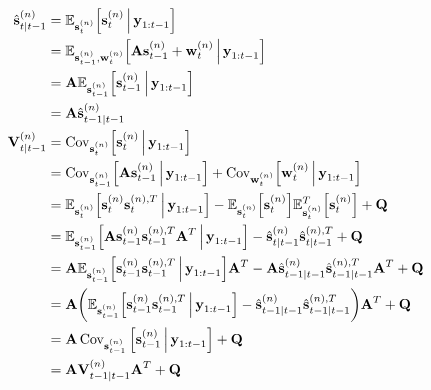 		\begin{align*}
			\hat{\vec{s}}_{t \subgiven t - 1}^{(n)}
				&= \E_{\vec{s}_t^{(n)}}\Big[\vec{s}_t^{(n)} \Biggiven \vec{y}_{1:t - 1}\Big] \\
				&= \E_{\vec{s}_{t - 1}^{(n)}, \vec{w}_t^{(n)}}\Big[\mat{A} \vec{s}_{t - 1}^{(n)} + \vec{w}_t^{(n)} \Biggiven \vec{y}_{1:t - 1}\Big] \\
				&= \mat{A} \E_{\vec{s}_{t - 1}^{(n)}}\Big[\vec{s}_{t - 1}^{(n)} \Biggiven \vec{y}_{1:t - 1}\Big] \\
				&= \mat{A} \hat{\vec{s}}_{t - 1 \subgiven t - 1}^{(n)} \\
			\mat{V}_{t \subgiven t - 1}^{(n)}
				&= \Cov_{\vec{s}_t^{(n)}}\!\Big[\vec{s}_t^{(n)} \Biggiven \vec{y}_{1:t - 1}\Big] \\
				&= \Cov_{\vec{s}_{t - 1}^{(n)}}\!\Big[\mat{A} \vec{s}_{t - 1}^{(n)} \Biggiven \vec{y}_{1:t - 1}\Big] + \Cov_{\vec{w}_t^{(n)}}\!\Big[\vec{w}_t^{(n)} \Biggiven \vec{y}_{1:t - 1}\Big] \\
				&= \E_{\vec{s}_t^{(n)}}\Big[ \vec{s}_t^{(n)} \vec{s}_t^{(n), T} \Biggiven \vec{y}_{1:t - 1} \Big] - \E_{\vec{s}_t^{(n)}}\Big[\vec{s}_t^{(n)}\Big] \E_{\vec{s}_t^{(n)}}^T\Big[\vec{s}_t^{(n)}\Big] + \mat{Q} \\
				&= \E_{\vec{s}_{t - 1}^{(n)}}\Big[ \mat{A} \vec{s}_{t - 1}^{(n)} \vec{s}_{t - 1}^{(n), T} \mat{A}^T \Biggiven \vec{y}_{1:t - 1} \Big] - \hat{\vec{s}}_{t \subgiven t - 1}^{(n)} \hat{\vec{s}}_{t \subgiven t - 1}^{(n), T} + \mat{Q} \\
				&= \mat{A} \E_{\vec{s}_{t - 1}^{(n)}}\Big[ \vec{s}_{t - 1}^{(n)} \vec{s}_{t - 1}^{(n), T} \Biggiven \vec{y}_{1:t - 1} \Big] \mat{A}^T - \mat{A} \hat{\vec{s}}_{t - 1 \subgiven t - 1}^{(n)} \hat{\vec{s}}_{t - 1\subgiven t - 1}^{(n), T} \mat{A}^T + \mat{Q} \\
				&= \mat{A} \bigg( \E_{\vec{s}_{t - 1}^{(n)}}\Big[ \vec{s}_{t - 1}^{(n)} \vec{s}_{t - 1}^{(n), T} \Biggiven \vec{y}_{1:t - 1} \Big] - \hat{\vec{s}}_{t - 1 \subgiven t - 1}^{(n)} \hat{\vec{s}}_{t - 1\subgiven t - 1}^{(n), T} \bigg) \mat{A}^T + \mat{Q} \\
				&= \mat{A} \Cov_{\vec{s}_{t - 1}^{(n)}}\Big[ \vec{s}_{t - 1}^{(n)} \Biggiven \vec{y}_{1:t - 1} \Big] + \mat{Q} \\
				&= \mat{A} \mat{V}_{t - 1 \subgiven t - 1}^{(n)} \mat{A}^T + \mat{Q}
		\end{align*}

